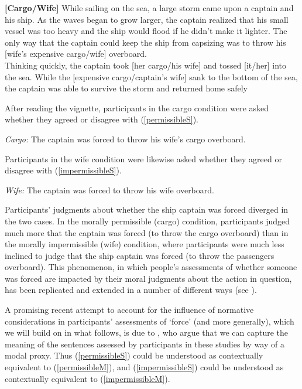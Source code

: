 \documentclass{salt}
\newcommand{\reff}[1]{(\ref{#1})}
\begin{document}
\begin{exe}
\ex \label{cargo} \textbf{[Cargo/Wife]} While sailing on the sea, a large storm came upon a captain and his ship.  As the waves began to grow larger, the captain realized that his small vessel was too heavy and the ship would flood if he didn't make it lighter.  The only way that the captain could keep the ship from capsizing was to throw his [wife's expensive cargo/wife] overboard.\\ \hspace*{.5cm} Thinking quickly, the captain took [her cargo/his wife] and tossed [it/her] into the sea.  While the [expensive cargo/captain's wife] sank to the bottom of the sea, the captain was able to survive the storm and returned home safely\end{exe}

\noindent After reading the vignette, participants in the cargo condition were asked whether they agreed or disagree with \reff{permissibleS}.

\begin{exe}
\ex \label{permissibleS} \textit{Cargo:} The captain was forced to throw his wife's cargo overboard.\end{exe}

\noindent Participants in the wife condition were likewise asked whether they agreed or disagree with \reff{impermissibleS}.

\begin{exe}\ex \label{impermissibleS} \textit{Wife:} The captain was forced to throw his wife overboard.\end{exe}

Participants' judgments about whether the ship captain was forced diverged in the two cases. In the morally permissible (cargo) condition, participants judged much more that the captain was forced (to throw the cargo overboard) than in the morally impermissible (wife) condition, where participants were much less inclined to judge that the ship captain was forced (to throw the passengers overboard). This phenomenon, in which people's assessments of whether someone was forced are impacted by their moral judgments about the action in question, has  been replicated and extended in a number of different ways (see \citealt{young2011paradox,chakroff2015harmful,phillips2015unifying}).

A promising recent  attempt to account for the influence of normative considerations in participants' assessments of `force' (and more generally), which we will build on in what follows, is due to \citealt{knobe2013modals}, who argue that we can capture the meaning of the sentences assessed by participants in these studies by way of a modal proxy. Thus \reff{permissibleS} could be understood as contextually equivalent to \reff{permissibleM}, and \reff{impermissibleS} could be understood as contextually equivalent to \reff{impermissibleM}.
\end{document}
